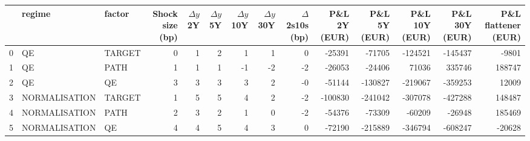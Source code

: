 \begin{tabular}{lllrrrrrrrrrrr}
\toprule
 & regime & factor & Shock size (bp) & $\Delta y$ 2Y & $\Delta y$ 5Y & $\Delta y$ 10Y & $\Delta y$ 30Y & $\Delta$ 2s10s (bp) & P\&L 2Y (EUR) & P\&L 5Y (EUR) & P\&L 10Y (EUR) & P\&L 30Y (EUR) & P\&L flattener (EUR) \\
\midrule
0 & QE & TARGET & 0 & 1 & 2 & 1 & 1 & 0 & -25391 & -71705 & -124521 & -145437 & -9801 \\
1 & QE & PATH & 1 & 1 & 1 & -1 & -2 & -2 & -26053 & -24406 & 71036 & 335746 & 188747 \\
2 & QE & QE & 3 & 3 & 3 & 3 & 2 & -0 & -51144 & -130827 & -219067 & -359253 & 12009 \\
3 & NORMALISATION & TARGET & 1 & 5 & 5 & 4 & 2 & -2 & -100830 & -241042 & -307078 & -427288 & 148487 \\
4 & NORMALISATION & PATH & 2 & 3 & 2 & 1 & 0 & -2 & -54376 & -73309 & -60209 & -26948 & 185469 \\
5 & NORMALISATION & QE & 4 & 4 & 5 & 4 & 3 & 0 & -72190 & -215889 & -346794 & -608247 & -20628 \\
\bottomrule
\end{tabular}
